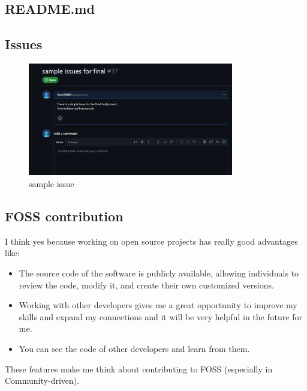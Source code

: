 \documentclass{article}
\begin{document}
    \subsection{README.md}
    \subsection{Issues}
    \begin{figure}[h]
    \centering
    \includegraphics[width=0.8\textwidth]{sample issue.png}
    \caption{sample issue}
    \end{figure}
    \subsection{FOSS contribution}
    I think yes because working on open source projects has really good advantages like: 
    \begin{itemize}
        \item The source code of the software is publicly available, allowing individuals to review the code, modify it, and create their own customized versions.
        \item Working with other developers gives me a great opportunity to improve my skills and expand my connections and it will be very helpful in the future for me.
        \item You can see the code of other developers and learn from them.
        \end{itemize}
    These features make me think about contributing to FOSS (especially in Community-driven).
        
\end{document}
